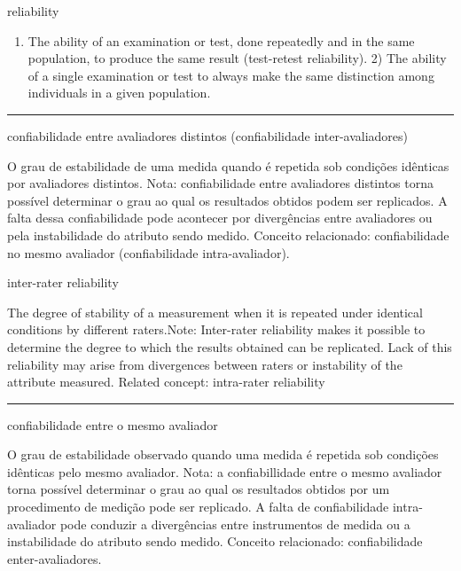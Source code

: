 \documentclass[
  openany]{book}
\providecommand{\tightlist}{%
  \setlength{\itemsep}{0pt}\setlength{\parskip}{0pt}}
\begin{document}
reliability

\begin{enumerate}
\def\labelenumi{\arabic{enumi})}
\tightlist
\item
  The ability of an examination or test, done repeatedly and in the same population, to produce the same result (test-retest reliability). 2) The ability of a single examination or test to always make the same distinction among individuals in a given population.
\end{enumerate}

\begin{center}\rule{0.5\linewidth}{0.5pt}\end{center}

confiabilidade entre avaliadores distintos (confiabilidade inter-avaliadores)

O grau de estabilidade de uma medida quando é repetida sob condições idênticas por avaliadores distintos. Nota: confiabilidade entre avaliadores distintos torna possível determinar o grau ao qual os resultados obtidos podem ser replicados. A falta dessa confiabilidade pode acontecer por divergências entre avaliadores ou pela instabilidade do atributo sendo medido. Conceito relacionado: confiabilidade no mesmo avaliador (confiabilidade intra-avaliador).

inter-rater reliability

The degree of stability of a measurement when it is repeated under identical conditions by different raters.Note: Inter-rater reliability makes it possible to determine the degree to which the results obtained can be replicated. Lack of this reliability may arise from divergences between raters or instability of the attribute measured. Related concept: intra-rater reliability

\begin{center}\rule{0.5\linewidth}{0.5pt}\end{center}

confiabilidade entre o mesmo avaliador

O grau de estabilidade observado quando uma medida é repetida sob condições idênticas pelo mesmo avaliador. Nota: a confiabillidade entre o mesmo avaliador torna possível determinar o grau ao qual os resultados obtidos por um procedimento de medição pode ser replicado. A falta de confiabilidade intra-avaliador pode conduzir a divergências entre instrumentos de medida ou a instabilidade do atributo sendo medido. Conceito relacionado: confiabilidade enter-avaliadores.
\end{document}
